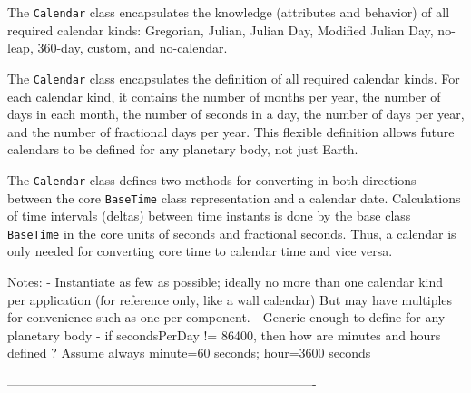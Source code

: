    The {\tt Calendar} class encapsulates the knowledge (attributes and
   behavior) of all required calendar kinds:  Gregorian, Julian, Julian Day,
   Modified Julian Day, no-leap, 360-day, custom, and no-calendar.
  
   The {\tt Calendar} class encapsulates the definition of all required
   calendar kinds. For each calendar kind, it contains the number of months
   per year, the number of days in each month, the number of seconds in a day,
   the number of days per year, and the number of fractional days per year.
   This flexible definition allows future calendars to be defined for any
   planetary body, not just Earth.
  
   The {\tt Calendar} class defines two methods for converting in both
   directions between the core {\tt BaseTime} class representation and a
   calendar date.  Calculations of time intervals (deltas) between
   time instants is done by the base class {\tt BaseTime} in the core units
   of seconds and fractional seconds.  Thus,  a calendar is only needed for
   converting core time to calendar time and vice versa.
  
   Notes:
      - Instantiate as few as possible; ideally no more than one calendar
        kind per application (for reference only, like a wall calendar)
        But may have multiples for convenience such as one per component.
      - Generic enough to define for any planetary body
      - if secondsPerDay != 86400, then how are minutes and hours defined ?
        Assume always minute=60 seconds; hour=3600 seconds
  
  -------------------------------------------------------------------------
    
